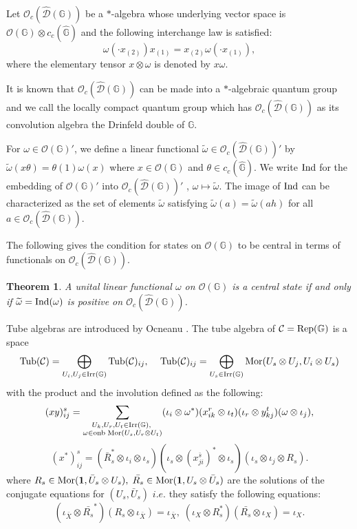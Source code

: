 \documentclass[12pt]{amsart}
\theoremstyle{plain} %
\newtheorem{theorem}[equation]{Theorem}
\theoremstyle{definition}
\theoremstyle{remark}
\begin{document}
Let $\mathcal{O}_c(\widehat{\mathcal{D}}(\mathbb{G}))$ be a $*$-algebra whose underlying vector space is $\mathcal{O}(\mathbb{G})\otimes c_c(\widehat{\mathbb{G}})$ and the following interchange law is satisfied:
\[\omega(\cdot x_{(2)})x_{(1)}=x_{(2)}\omega(\cdot x_{(1)}),\]
where the elementary tensor $x \otimes \omega$ is denoted by $x\omega$.
 
 It is known that $\mathcal{O}_c(\widehat{\mathcal{D}}(\mathbb{G}))$ can be made into a $*$-algebraic quantum group \cite[Theorem 3.16]{DVD} and we call the locally compact quantum group which has $\mathcal{O}_c(\widehat{\mathcal{D}}(\mathbb{G}))$ as its convolution algebra the Drinfeld double of $\mathbb{G}$. 
  
 For $\omega \in \mathcal{O}(\mathbb{G})'$, we define a linear functional $\widetilde \omega \in \mathcal{O}_c(\widehat{\mathcal{D}}(\mathbb{G}))'$ by $\widetilde \omega(x\theta)=\theta(1)\omega(x)$ where $x\in \mathcal{O}(\mathbb{G})$ and $\theta \in c_c(\widehat{\mathbb{G}})$.
 We write ${\rm Ind}$ for the embedding of $\mathcal{O}(\mathbb{G})'$ into $\mathcal{O}_c(\widehat{\mathcal{D}}(\mathbb{G}))'$ , $\omega \mapsto \widetilde{\omega} $. The image of ${\rm Ind}$ can be characterized as the set of elements $\widetilde{\omega}$ satisfying $\widetilde{\omega}(a)=\widetilde{\omega}(ah)$ for all $a\in \mathcal{O}_c(\widehat{\mathcal{D}}(\mathbb{G}))$.
 
 The following \cite[Theorem 29]{DCFY} gives the condition for states on $\mathcal{O}(\mathbb{G})$ to be central in terms of functionals on $\mathcal{O}_c(\widehat{\mathcal{D}}(\mathbb{G}))$.

 \begin{theorem}
A unital linear functional $\omega$ on $\mathcal{O}(\mathbb{G})$ is a central state if and only if $\widetilde{\omega} = {\rm Ind}(\omega)$ is positive on $\mathcal{O}_c(\widehat{\mathcal{D}}(\mathbb{G}))$.
\end{theorem}

Tube algebras are introduced by Ocneanu \cite[Section 3]{EK95}.
The tube algebra of $\mathcal{C}={\rm Rep}(\mathbb{G})$ is a space 
 \[ {\rm Tub}(\mathcal{C})= \bigoplus_{U_i, U_j\in {\rm Irr} (\mathbb{G})} {\rm Tub}(\mathcal{C})_{ij},\;\;\;\ {\rm Tub}(\mathcal{C})_{ij}=\bigoplus_{U_s\in {\rm Irr} (\mathbb{G})} {\rm Mor}(U_s\otimes U_j, U_i\otimes U_s)\]
 with the product and the involution defined as the following:
 \[(xy)^s_{ij}=\sum_{\substack{U_k, U_r, U_t\in {\rm Irr} (\mathbb{G}),\; \\ \omega \in {\rm onb}\; {\rm Mor}(U_s, U_r\otimes U_t)}}  (\iota_i\otimes \omega^*)(x^r_{ik}\otimes \iota_t)(\iota_r \otimes y^t_{kj})(\omega\otimes \iota_j),\]
 \[(x^*)^s_{ij}=(\bar{R}^*_s\otimes \iota_i\otimes\iota_s)(\iota_s\otimes(x^{\bar{s}}_{ji})^*\otimes\iota_s)(\iota_s\otimes\iota_j\otimes R_s).\]
 where $R_s\in {\rm Mor}(\mathbf{1}, \bar{U}_s\otimes U_s), \;\bar{R_s}\in {\rm Mor}(\mathbf{1}, U_s\otimes\bar{U}_s)$ are the solutions of the conjugate equations for $(U_s, \bar{U}_s)$ $i. e.$ they satisfy the following equations:
 \[(\iota_{\bar{X}}\otimes\bar{R_s}^*)(R_s\otimes\iota_{\bar{X}})=\iota_{\bar{X}},\;(\iota_X\otimes R_s^*)(\bar{R_s}\otimes\iota_X)=\iota_X.\]
 
\end{document}
